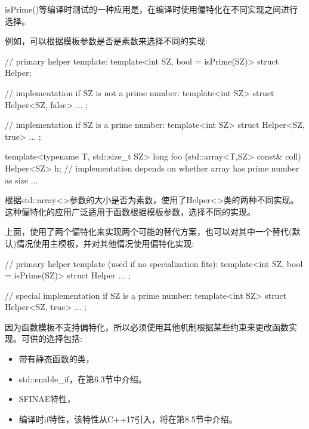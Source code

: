 isPrime()等编译时测试的一种应用是，在编译时使用偏特化在不同实现之间进行选择。

例如，可以根据模板参数是否是素数来选择不同的实现:

\begin{cpp}
// primary helper template:
template<int SZ, bool = isPrime(SZ)>
struct Helper;

// implementation if SZ is not a prime number:
template<int SZ>
struct Helper<SZ, false>
{
	...
};

// implementation if SZ is a prime number:
template<int SZ>
struct Helper<SZ, true>
{
	...
};

template<typename T, std::size_t SZ>
long foo (std::array<T,SZ> const& coll)
{
	Helper<SZ> h; // implementation depends on whether array has prime number as size
	...
}
\end{cpp}

根据std::array<>参数的大小是否为素数，使用了Helper<>类的两种不同实现。这种偏特化的应用广泛适用于函数根据模板参数，选择不同的实现。

上面，使用了两个偏特化来实现两个可能的替代方案，也可以对其中一个替代(默认)情况使用主模板，并对其他情况使用偏特化实现:

\begin{cpp}
// primary helper template (used if no specialization fits):
template<int SZ, bool = isPrime(SZ)>
struct Helper
{
	...
};

// special implementation if SZ is a prime number:
template<int SZ>
struct Helper<SZ, true>
{
	...
};
\end{cpp}

因为函数模板不支持偏特化，所以必须使用其他机制根据某些约束来更改函数实现。可供的选择包括:

\begin{itemize}
\item 
带有静态函数的类，

\item 
std::enable\_if，在第6.3节中介绍。

\item 
SFINAE特性，

\item 
编译时if特性，该特性从C++17引入，将在第8.5节中介绍。
\end{itemize}

